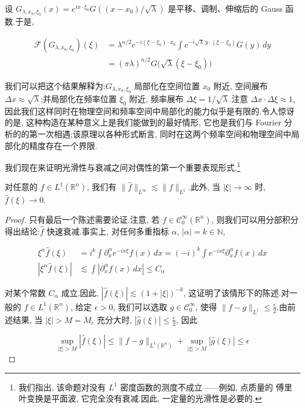 设 $G_{\lambda, x_0, \xi_0}(x) = e^{ix\cdot\xi_0}G((x-x_0)/\sqrt{\lambda})$ 是平移、调制、伸缩后的 Gauss 函数.于是,

\[
\begin{aligned}
\mathcal{F}(G_{\lambda, x_0, \xi_0})(\xi) &= \lambda^{n/2}e^{-i(\xi-\xi_0)\cdot x_0}\int e^{-i\sqrt{\lambda}\, y\cdot(\xi-\xi_0)}G(y)\, dy \\
&= (\pi\lambda)^{n/2}G\big(\sqrt{\lambda}(\xi-\xi_0)\big)
\end{aligned}
\]

我们可以把这个结果解释为:$G_{\lambda, x_0, \xi_0}$ 局部化在空间位置 $x_0$ 附近, 空间展布 $\Delta x\approx\sqrt{\lambda}$;并局部化在频率位置 $\xi_0$ 附近, 频率展布 $\Delta\xi = 1/\sqrt{\lambda}$.注意 $\Delta x\cdot\Delta\xi\approx 1$, 因此我们这样同时在物理空间和频率空间中局部化的能力似乎是有限的.令人惊讶的是, 这种构造在某种意义上是我们能做到的最好情形, 它也是我们与 Fourier 分析的的第一次相遇;该原理以各种形式断言, 同时在这两个频率空间和物理空间中局部化的精度存在一个界限.

我们现在来证明光滑性与衰减之间对偶性的第一个重要表现形式.\footnote{我们指出, 该命题对没有 $L^1$ 密度函数的测度不成立——例如, 点质量的 傅里叶变换是平面波, 它完全没有衰减.因此, 一定量的光滑性是必要的.}

\begin{proposition}\label{prop:c5-1.3}
对任意的 $f \in L^1(\mathbb{R}^n)$, 我们有 $\|\hat{f}\|_{L^\infty}\lesssim\|f\|_{L^1}$.此外, 当 $|\xi|\to\infty$ 时, $\hat{f}(\xi)\to 0$.
\end{proposition}

\begin{proof}
只有最后一个陈述需要论证.注意, 若 $f\in\mathcal{C}_0^\infty(\mathbb{R}^n)$, 则我们可以用分部积分得出结论:$\hat{f}$ 快速衰减.事实上, 对任何多重指标 $\alpha$, $|\alpha| = k\in\mathbb{N}$,

\[
\begin{aligned}
\xi^\alpha\hat{f}(\xi) &= i^k\int\partial_x^\alpha e^{-ix\xi}f(x)\, dx = (-i)^k\int e^{-ix\xi}\partial_x^\alpha f(x)\, dx \\
|\xi^\alpha\hat{f}(\xi)| &\lesssim \int|\partial_x^\alpha f(x)\, dx| \leq C_\alpha
\end{aligned}
\]

对某个常数 $C_\alpha$ 成立.因此, $|\hat{f}(\xi)|\lesssim(1+|\xi|)^{-k}$, 这证明了该情形下的陈述.对一般的 $f\in L^1(\mathbb{R}^n)$, 给定 $\epsilon>0$, 我们可以选取 $g\in\mathcal{C}_0^\infty$, 使得 $\|f-g\|_{L^1}\leq\frac{\epsilon}{2}$.由前述结果, 当 $|\xi|>M = M_\epsilon$ 充分大时, $|\hat{g}(\xi)|\leq\frac{\epsilon}{2}$, 因此

\[
\sup_{|\xi|>M}|\hat{f}(\xi)| \leq \|f-g\|_{L^1(\mathbb{R}^n)} + \sup_{|\xi|>M}|\hat{g}(\xi)| \leq \epsilon
\]
\end{proof}


